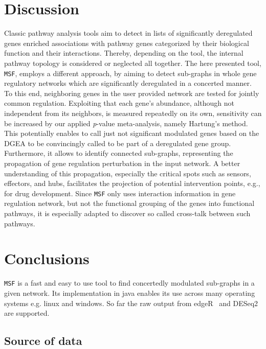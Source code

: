 \documentclass[10pt,a4paper,twocolumn]{article}
\begin{document}
	\section*{Discussion}
	
	Classic pathway analysis tools aim to detect in lists of significantly
	deregulated genes enriched associations with pathway genes categorized by
	their biological function and their interactions. Thereby, depending on the
	tool, the internal pathway topology is considered or neglected all
	together. The here presented tool, \texttt{MSF}, employs a different
	approach, by aiming to detect sub-graphs in whole gene regulatory networks
	which are significantly deregulated in a concerted manner. To this end,
	neighboring genes in the user provided network are tested for jointly
	common regulation. Exploiting that each gene's abundance, although not
	independent from its neighbors, is measured repeatedly on its own,
	sensitivity can be increased by our applied \textit{p}-value meta-analysis, namely
	Hartung's method. This potentially enables to call just not significant
	modulated genes based on the DGEA to be convincingly called to be part of a
	deregulated gene group.  Furthermore, it allows to identify connected
	sub-graphs, representing the propagation of gene regulation perturbation in
	the input network. A better understanding of this propagation, especially
	the critical spots such as sensors, effectors, and hubs, facilitates the projection of potential intervention points,
	e.g., for drug development. Since \texttt{MSF} only uses interaction
	information in gene regulation network, but not the functional grouping of
	the genes into functional pathways, it is especially adapted to discover so
	called cross-talk between such pathways.
	
	
	\section*{Conclusions}
	
	
	\texttt{MSF} is a fast and easy to use tool to find concertedly
	modulated sub-graphs in a given network. Its implementation in java enables
	its use across many operating systems e.g. linux and windows. So far the raw output from edgeR~\cite{edgeR} and DESeq2~\cite{love2014moderated} are supported.
	
	\subsection*{Source of data}
	
\end{document}
